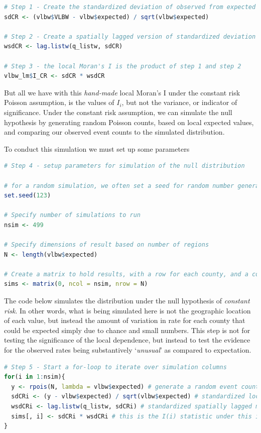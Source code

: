 \documentclass[
]{book}
\begin{document}
\begin{lstlisting}[language=R]
# Step 1 - Create the standardized deviation of observed from expected
sdCR <- (vlbw$VLBW - vlbw$expected) / sqrt(vlbw$expected)

# Step 2 - Create a spatially lagged version of standardized deviation of neighbors
wsdCR <- lag.listw(q_listw, sdCR)

# Step 3 - the local Moran's I is the product of step 1 and step 2
vlbw_lm$I_CR <- sdCR * wsdCR
\end{lstlisting}

But all we have with this \emph{hand-made} local Moran's I under the constant risk Poisson assumption, is the values of \(I_i\), but not the variance, or indicator of significance. Under the constant risk assumption, we can simulate the null hypothesis by generating random Poisson counts, based on local expected values, and comparing our observed event counts to the simulated distribution.

To conduct this simulation we must set up some parameters

\begin{lstlisting}[language=R]
# Step 4 - setup parameters for simulation of the null distribution

# for a random simulation, we often set a seed for random number generator
set.seed(123)

# Specify number of simulations to run
nsim <- 499

# Specify dimensions of result based on number of regions
N <- length(vlbw$expected)

# Create a matrix to hold results, with a row for each county, and a column for each simulation
sims <- matrix(0, ncol = nsim, nrow = N)
\end{lstlisting}

The code below simulates the distribution under the null hypothesis of \emph{constant risk}. In other words, what is being simulated here is not the geographic location of each value, but instead the amount of variation in rate for each county that could be expected simply due to chance and small numbers. This step is not for testing the significance of the local dependence, but instead to test the evidence for the observed rates being substantively `\emph{unusual}' as compared to expectation.

\begin{lstlisting}[language=R]
# Step 5 - Start a for-loop to iterate over simulation columns
for(i in 1:nsim){
  y <- rpois(N, lambda = vlbw$expected) # generate a random event count, given expected
  sdCRi <- (y - vlbw$expected) / sqrt(vlbw$expected) # standardized local measure
  wsdCRi <- lag.listw(q_listw, sdCRi) # standardized spatially lagged measure
  sims[, i] <- sdCRi * wsdCRi # this is the I(i) statistic under this iteration of null
}
\end{lstlisting}
\end{document}
